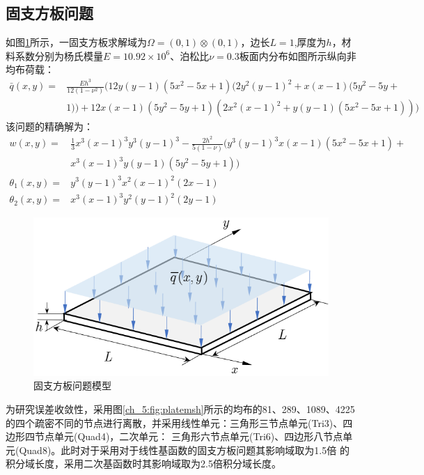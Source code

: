 \subsection{固支方板问题}
如图\ref{ch_5:fig:plate}所示，一固支方板求解域为$\Omega=(0,1)\otimes(0,1)$，边长$L=1$,厚度为$h$，材料系数分别为杨氏模量$E=10.92\times10^6$、泊松比$\nu=0.3$板面内分布如图所示纵向非均布荷载：
\begin{equation} 
\begin{split} 
    \bar{q}(x,y) =&\frac{Eh^3}{12(1-\nu^2)}(12y(y-1)(5x^2-5x+1)(2y^2(y-1)^2+x(x-1)(5y^2-5y+\\
    &1))+12x(x-1)(5y^2-5y+1)(2x^2(x-1)^2+y(y-1)(5x^2-5x+1)))
\end{split} 
\end{equation}
该问题的精确解为：
\begin{equation} 
    \begin{split} 
        w(x,y) =&\frac{1}{3}x^3(x-1)^3y^3(y-1)^3-\frac{2h^2}{5(1-\nu)}(y^3(y-1)^3x(x-1)(5x^2-5x+1)+\\
        &x^3(x-1)^3y(y-1)(5y^2-5y+1))\\
        \theta_1(x,y) =& y^3(y-1)^3x^2(x-1)^2(2x-1)\\
        \theta_2(x,y) =& x^3(x-1)^3y^2(y-1)^2(2y-1)
    \end{split} 
\end{equation}
\begin{figure}[!h]
    \centering 
        \includegraphics[scale=0.8]{figures/shearlocking/plate.png}
        \caption{固支方板问题模型}\label{ch_5:fig:plate}
\end{figure}

为研究误差收敛性，采用图\ref{ch_5:fig:platemsh}所示的均布的81、289、1089、4225
的四个疏密不同的节点进行离散，并采用线性单元：三角形三节点单元(Tri3)、四边形四节点单元(Quad4)，二次单元：
三角形六节点单元(Tri6)、四边形八节点单元(Quad8)。此时对于采用对于线性基函数的固支方板问题其影响域取为1.5倍
的积分域长度，采用二次基函数时其影响域取为2.5倍积分域长度。

